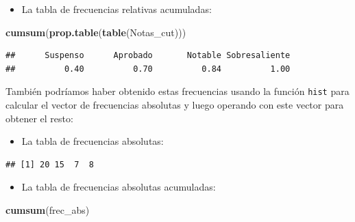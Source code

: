 \documentclass[]{book}
\newenvironment{Shaded}{\begin{snugshade}}{\end{snugshade}}
\newcommand{\DataTypeTok}[1]{\textcolor[rgb]{0.13,0.29,0.53}{#1}}
\newcommand{\DecValTok}[1]{\textcolor[rgb]{0.00,0.00,0.81}{#1}}
\newcommand{\KeywordTok}[1]{\textcolor[rgb]{0.13,0.29,0.53}{\textbf{#1}}}
\newcommand{\NormalTok}[1]{#1}
\newcommand{\OperatorTok}[1]{\textcolor[rgb]{0.81,0.36,0.00}{\textbf{#1}}}
\newcommand{\OtherTok}[1]{\textcolor[rgb]{0.56,0.35,0.01}{#1}}
\providecommand{\tightlist}{%
  \setlength{\itemsep}{0pt}\setlength{\parskip}{0pt}}
\theoremstyle{definition}
\theoremstyle{definition}
\theoremstyle{definition}
\theoremstyle{remark}
\begin{document}
\begin{itemize}
\tightlist
\item
  La tabla de frecuencias relativas acumuladas:
\end{itemize}

\begin{Shaded}
\begin{Highlighting}[]
\KeywordTok{cumsum}\NormalTok{(}\KeywordTok{prop.table}\NormalTok{(}\KeywordTok{table}\NormalTok{(Notas_cut)))  }
\end{Highlighting}
\end{Shaded}

\begin{verbatim}
##      Suspenso      Aprobado       Notable Sobresaliente 
##          0.40          0.70          0.84          1.00
\end{verbatim}

También podríamos haber obtenido estas frecuencias usando la función \texttt{hist} para calcular el vector de frecuencias absolutas y luego operando con este vector para obtener el resto:

\begin{itemize}
\tightlist
\item
  La tabla de frecuencias absolutas:
\end{itemize}

\begin{Shaded}
\end{Shaded}

\begin{verbatim}
## [1] 20 15  7  8
\end{verbatim}

\begin{itemize}
\tightlist
\item
  La tabla de frecuencias absolutas acumuladas:
\end{itemize}

\begin{Shaded}
\begin{Highlighting}[]
\KeywordTok{cumsum}\NormalTok{(frec_abs) }
\end{Highlighting}
\end{Shaded}
\end{document}
